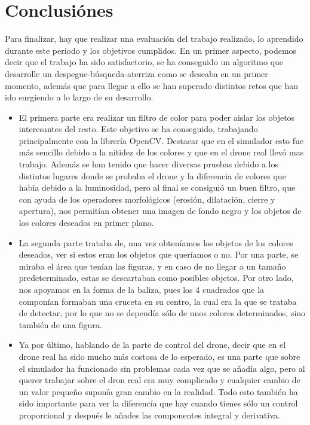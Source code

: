 \chapter{Conclusi\'ones}\label{cap.conclusiones}

\hspace{1cm} Para finalizar, hay que realizar una evaluaci\'on del trabajo realizado, lo aprendido durante este periodo y los objetivos cumplidos. En un primer aspecto, podemos decir que el trabajo ha sido satisfactorio, se ha conseguido un algoritmo que desarrolle un despegue-b\'usqueda-aterriza como se deseaba en un primer momento, adem\'as que para llegar a ello se han superado distintos retos que han ido surgiendo a lo largo de su desarrollo.

\begin{itemize}
	\item El primera parte era realizar un filtro de color para poder aislar los objetos interesantes del resto. Este objetivo se ha conseguido, trabajando principalmente con la librer\'ia OpenCV. Destacar que en el simulador esto fue m\'as sencillo debido a la nitidez de los colores y que en el drone real llev\'o mas trabajo. Adem\'as se han tenido que hacer diversas pruebas debido a los distintos lugares donde se probaba el drone y la diferencia de colores que hab\'ia debido a la luminosidad, pero al final se consigui\'o un buen filtro, que con ayuda de los operadores morfol\'ogicos (erosi\'on, dilataci\'on, cierre y apertura), nos permit\'ian obtener una imagen de fondo negro y los objetos de los colores deseados en primer plano.

	\item La segunda parte trataba de, una vez obten\'iamos los objetos de los colores deseados, ver si estos eran los objetos que quer\'iamos o no. Por una parte, se miraba el \'area que ten\'ian las figuras, y en caso de no llegar a un tamaño predeterminado, estas se descartaban como posibles objetos. Por otro lado, nos apoyamos en la forma de la baliza, pues los 4 cuadrados que la compon\'ian formaban una cruceta en su centro, la cual era la que se trataba de detectar, por lo que no se depend\'ia s\'olo de unos colores determinados, sino tambi\'en de una figura. 
	
	\item Ya por \'ultimo, hablando de la parte de control del drone, decir que en el drone real ha sido mucho m\'as costosa de lo esperado, es una parte que sobre el simulador ha funcionado sin problemas cada vez que se añad\'ia algo, pero al querer trabajar sobre el dron real era muy complicado y cualquier cambio de un valor pequeño supon\'ia gran cambio en la realidad. Todo esto tambi\'en ha sido importante para ver la diferenc\'ia que hay cuando tienes s\'olo un control proporcional y despu\'es le añades las componentes integral y derivativa. 
	
\end{itemize}

